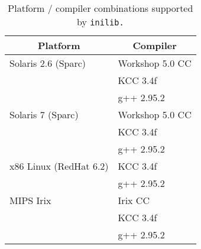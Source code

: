 \begin{table}
  \begin{center}
    \begin{tabular}[hb!]{| l | l |} 
      \hline
      \multicolumn{1}{|c|}{Platform} & \multicolumn{1}{c|}{Compiler}
      \\
      \hline
      Solaris 2.6 (Sparc)    & Workshop 5.0 CC \\
      & KCC 3.4f \\
      & g++ 2.95.2 \\ \hline
      Solaris 7 (Sparc)      & Workshop 5.0 CC \\
      & KCC 3.4f \\
      & g++ 2.95.2 \\ \hline
      x86 Linux (RedHat 6.2) & KCC 3.4f \\
      & g++ 2.95.2 \\ \hline
      MIPS Irix              & Irix CC \\
      & KCC 3.4f \\
      & g++ 2.95.2 \\ \hline
    \end{tabular}
  \end{center}
  \caption{Platform / compiler combinations supported by {\tt inilib.}}
  \label{tbl:supported}
\end{table}


